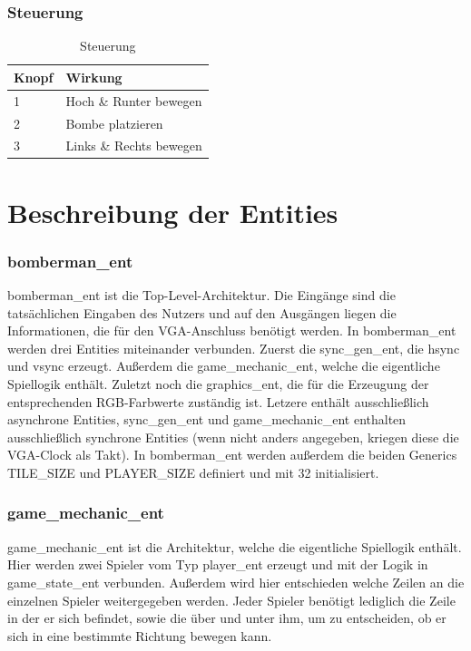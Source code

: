 \documentclass[parskip=full]{scrartcl}
\begin{document}
		
		\section{Steuerung}
			\begin{table}[H]
				\centering
				\label{controls}
				\begin{tabular}{|l|l|}
					\hline
					\textbf{Knopf} & \textbf{Wirkung}      \\ \hline
					1           & Hoch \& Runter bewegen               \\ \hline
					2           & Bombe platzieren                 \\ \hline
					3           & Links \& Rechts bewegen                    \\ \hline
				\end{tabular}
				\caption{Steuerung}
			\end{table}
			
	
	\part{Beschreibung der Entities}
		\section{bomberman\_ent}
			bomberman\_ent ist die Top-Level-Architektur. Die Eingänge sind die tatsächlichen Eingaben des Nutzers und auf den Ausgängen liegen die Informationen, die für den VGA-Anschluss benötigt werden. In bomberman\_ent werden drei Entities miteinander verbunden. Zuerst die sync\_gen\_ent, die hsync und vsync erzeugt. Außerdem die game\_mechanic\_ent, welche die eigentliche Spiellogik enthält. Zuletzt noch die graphics\_ent, die für die Erzeugung der entsprechenden RGB-Farbwerte zuständig ist. 
			Letzere enthält ausschließlich asynchrone Entities, sync\_gen\_ent und game\_mechanic\_ent enthalten ausschließlich synchrone Entities (wenn nicht anders angegeben, kriegen diese die VGA-Clock als Takt).
			In bomberman\_ent werden außerdem die beiden Generics TILE\_SIZE und PLAYER\_SIZE definiert und mit 32 initialisiert.
		
		\section{game\_mechanic\_ent}
			game\_mechanic\_ent ist die Architektur, welche die eigentliche Spiellogik enthält. Hier werden zwei Spieler vom Typ player\_ent erzeugt und mit der Logik in game\_state\_ent verbunden. Außerdem wird hier entschieden welche Zeilen an die einzelnen Spieler weitergegeben werden. Jeder Spieler benötigt lediglich die Zeile in der er sich befindet, sowie die über und unter ihm, um zu entscheiden, ob er sich in eine bestimmte Richtung bewegen kann. 
		
\end{document}
